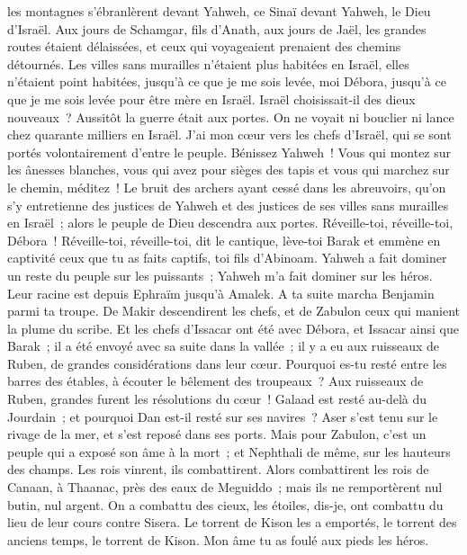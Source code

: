 \begin{multicols}{2}
les montagnes s'ébranlèrent devant Yahweh, ce Sinaï devant Yahweh, le Dieu d'Israël.
Aux jours de Schamgar, fils d'Anath, aux jours de Jaël, les grandes routes étaient délaissées, et ceux qui voyageaient prenaient des chemins détournés.
Les villes sans murailles n'étaient plus habitées en Israël, elles n'étaient point habitées, jusqu'à ce que je me sois levée, moi Débora, jusqu'à ce que je me sois levée pour être mère en Israël.
Israël choisissait-il des dieux nouveaux~? Aussitôt la guerre était aux portes. On ne voyait ni bouclier ni lance chez quarante milliers en Israël.
J'ai mon cœur vers les chefs d'Israël, qui se sont portés volontairement d'entre le peuple. Bénissez Yahweh~!
Vous qui montez sur les ânesses blanches, vous qui avez pour sièges des tapis et vous qui marchez sur le chemin, méditez~!
Le bruit des archers ayant cessé dans les abreuvoirs, qu'on s'y entretienne des justices de Yahweh et des justices de ses villes sans murailles en Israël~; alors le peuple de Dieu descendra aux portes.
Réveille-toi, réveille-toi, Débora~! Réveille-toi, réveille-toi, dit le cantique, lève-toi Barak et emmène en captivité ceux que tu as faits captifs, toi fils d'Abinoam.
Yahweh a fait dominer un reste du peuple sur les puissants~; Yahweh m'a fait dominer sur les héros.
Leur racine est depuis Ephraïm jusqu'à Amalek. A ta suite marcha Benjamin parmi ta troupe. De Makir descendirent les chefs, et de Zabulon ceux qui manient la plume du scribe.
Et les chefs d'Issacar ont été avec Débora, et Issacar ainsi que Barak~; il a été envoyé avec sa suite dans la vallée~; il y a eu aux ruisseaux de Ruben, de grandes considérations dans leur cœur.
Pourquoi es-tu resté entre les barres des étables, à écouter le bêlement des troupeaux~? Aux ruisseaux de Ruben, grandes furent les résolutions du cœur~!
Galaad est resté au-delà du Jourdain~; et pourquoi Dan est-il resté sur ses navires~? Aser s'est tenu sur le rivage de la mer, et s'est reposé dans ses ports.
Mais pour Zabulon, c'est un peuple qui a exposé son âme à la mort~; et Nephthali de même, sur les hauteurs des champs.
Les rois vinrent, ils combattirent. Alors combattirent les rois de Canaan, à Thaanac, près des eaux de Meguiddo~; mais ils ne remportèrent nul butin, nul argent.
On a combattu des cieux, les étoiles, dis-je, ont combattu du lieu de leur cours contre Sisera.
Le torrent de Kison les a emportés, le torrent des anciens temps, le torrent de Kison. Mon âme tu as foulé aux pieds les héros.

\end{multicols}
